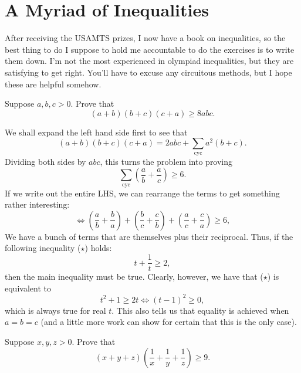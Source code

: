 \documentclass[a4paper, 12pt]{article}
\begin{document}
\section*{A Myriad of Inequalities}

After receiving the USAMTS prizes, I now have a book on inequalities, so the best thing to do I suppose to hold me accountable to do the exercises is to write them down. I'm not the most experienced in olympiad inequalities, but they are satisfying to get right. You'll have to excuse any circuitous methods, but I hope these are helpful somehow.

\begin{sidebox}
    \begin{problem}
        Suppose \( a, b, c > 0 \). Prove that
        \[
            (a + b)(b + c)(c + a) \ge 8abc
        .\]
    \end{problem}
\end{sidebox}

\begin{solution}
    We shall expand the left hand side first to see that
    \[
        (a + b)(b + c)(c + a) = 2abc + \sum_{\textrm{cyc}} a^2 (b + c)
    .\]
    Dividing both sides by \( abc \), this turns the problem into proving
    \[
        \sum_{\textrm{cyc}} \left( \frac{a}{b} + \frac{a}{c} \right) \ge 6
    .\]
    If we write out the entire LHS, we can rearrange the terms to get something rather interesting:
    \[
        \iff \left( \frac{a}{b} + \frac{b}{a} \right) + \left( \frac{b}{c} + \frac{c}{b} \right) + \left( \frac{a}{c} + \frac{c}{a} \right) \ge 6
    ,\]
    We have a bunch of terms that are themselves plus their reciprocal. Thus, if the following inequality (\( \star \)) holds:
    \[
        t + \frac{1}{t} \ge 2
    ,\]
    then the main inequality must be true. Clearly, however, we have that (\(\star \)) is equivalent to
    \[
        t^2 + 1 \ge 2t \iff (t - 1)^2 \ge 0
    ,\]
    which is always true for real \( t \). This also tells us that equality is achieved when \( a = b = c \) (and a little more work can show for certain that this is the only case).
\end{solution}

\begin{sidebox}
\begin{problem}
    Suppose \( x, y, z > 0 \). Prove that
    \[
        (x + y + z) \left( \frac{1}{x} + \frac{1}{y} + \frac{1}{z} \right) \ge 9
    .\]
\end{problem}
\end{sidebox}
\end{document}
